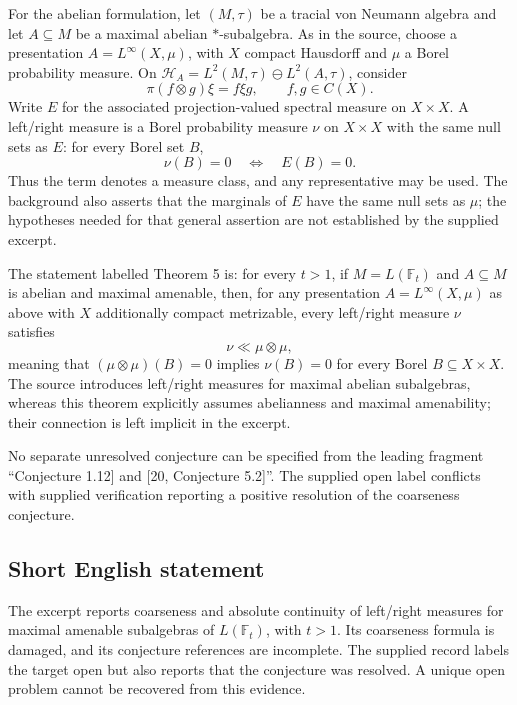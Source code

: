 \documentclass[11pt]{article}
\begin{document}
For the abelian formulation, let \((M,\tau)\) be a tracial von Neumann algebra and let \(A\subseteq M\) be a maximal abelian \(*\)-subalgebra. As in the source, choose a presentation \(A=L^\infty(X,\mu)\), with \(X\) compact Hausdorff and \(\mu\) a Borel probability measure. On \(\mathcal H_A=L^2(M,\tau)\ominus L^2(A,\tau)\), consider
\[
 \pi(f\otimes g)\xi=f\xi g,\qquad f,g\in C(X).
\]
Write \(E\) for the associated projection-valued spectral measure on \(X\times X\). A left/right measure is a Borel probability measure \(\nu\) on \(X\times X\) with the same null sets as \(E\): for every Borel set \(B\),
\[
 \nu(B)=0\quad\Longleftrightarrow\quad E(B)=0.
\]
Thus the term denotes a measure class, and any representative may be used. The background also asserts that the marginals of \(E\) have the same null sets as \(\mu\); the hypotheses needed for that general assertion are not established by the supplied excerpt.

The statement labelled Theorem 5 is: for every \(t>1\), if \(M=L(\mathbb F_t)\) and \(A\subseteq M\) is abelian and maximal amenable, then, for any presentation \(A=L^\infty(X,\mu)\) as above with \(X\) additionally compact metrizable, every left/right measure \(\nu\) satisfies
\[
 \nu\ll\mu\otimes\mu,
\]
meaning that \((\mu\otimes\mu)(B)=0\) implies \(\nu(B)=0\) for every Borel \(B\subseteq X\times X\). The source introduces left/right measures for maximal abelian subalgebras, whereas this theorem explicitly assumes abelianness and maximal amenability; their connection is left implicit in the excerpt.

No separate unresolved conjecture can be specified from the leading fragment ``Conjecture 1.12] and [20, Conjecture 5.2]''. The supplied open label conflicts with supplied verification reporting a positive resolution of the coarseness conjecture.
\subsection{Short English statement}
The excerpt reports coarseness and absolute continuity of left/right measures for maximal amenable subalgebras of \(L(\mathbb F_t)\), with \(t>1\). Its coarseness formula is damaged, and its conjecture references are incomplete. The supplied record labels the target open but also reports that the conjecture was resolved. A unique open problem cannot be recovered from this evidence.
\end{document}
